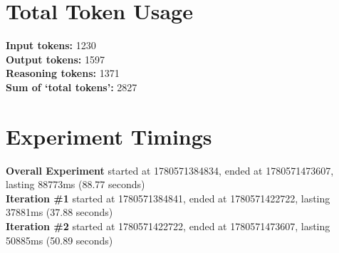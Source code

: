 \documentclass{article}
\begin{document}
\section*{Total Token Usage}
\textbf{Input tokens: }1230
\\\textbf{Output tokens: }1597
\\\textbf{Reasoning tokens: }1371
\\\textbf{Sum of `total tokens': }2827
\section*{Experiment Timings}
\textbf{Overall Experiment} started at 1780571384834, ended at 1780571473607, lasting 88773ms (88.77 seconds)
\\\textbf{Iteration \#1} started at 1780571384841, ended at 1780571422722, lasting 37881ms (37.88 seconds)
\\\textbf{Iteration \#2} started at 1780571422722, ended at 1780571473607, lasting 50885ms (50.89 seconds)
\end{document}
